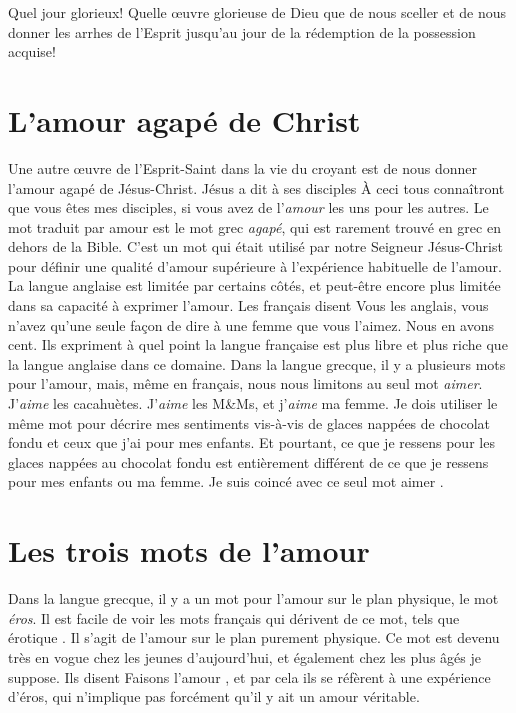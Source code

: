 Quel jour glorieux! Quelle œuvre glorieuse de Dieu que de nous sceller
 et de nous donner les arrhes de l'Esprit jusqu'au jour de la rédemption
 de la possession acquise!


\section{L'amour agap\'e de Christ}

Une autre œuvre de l'Esprit-Saint dans la vie du croyant
 est de nous donner l'amour agapé de Jésus-Christ.
 Jésus a dit à ses disciples\frcolon{}
 \Og À ceci tous connaîtront que vous êtes mes disciples,
 si vous avez de l'\emph{amour} les uns pour les autres. \Fg{}
 Le mot traduit par \Og amour \Fg{} est le mot grec \emph{agapé},
 qui est rarement trouvé en grec en dehors de la Bible.
 C'est un mot qui était utilisé par notre Seigneur Jésus-Christ
 pour définir une qualité d'amour supérieure à l'expérience habituelle
 de l'amour.
 La langue anglaise est limitée par certains côtés,
 et peut-être encore plus limitée dans sa capacité à exprimer l'amour.
 Les français disent\frcolon{}
 \Og Vous les anglais, vous n'avez qu'une seule façon de dire à une femme
 que vous l'aimez. Nous en avons cent. \Fg{}
 Ils expriment à quel point la langue française est plus libre et plus riche
 que la langue anglaise dans ce domaine.
 Dans la langue grecque, il y a plusieurs mots pour l'amour,
 mais, même en français, nous nous limitons au seul mot \emph{aimer}.
 J'\emph{aime} les cacahuètes. J'\emph{aime} les M\&Ms,
 et j'\emph{aime} ma femme.
 Je dois utiliser le même mot pour décrire mes sentiments
 vis-à-vis de glaces nappées de chocolat fondu et ceux que j'ai
 pour mes enfants. Et pourtant, ce que je ressens pour les glaces nappées
 au chocolat fondu est entièrement différent de ce que je ressens
 pour mes enfants ou ma femme.
 Je suis coincé avec ce seul mot \Og aimer \Fg{}.


\section{Les trois mots de l'amour}

Dans la langue grecque, il y a un mot pour l'amour sur le plan physique,
 le mot \emph{éros}.
 Il est facile de voir les mots français qui dérivent de ce mot,
 tels que \Og érotique \Fg{}.
 Il s'agit de l'amour sur le plan purement physique.
 Ce mot est devenu très en vogue chez les jeunes d'aujourd'hui,
 et également chez les plus âgés je suppose. Ils disent\frcolon{}
 \Og Faisons l'amour \Fg{}, et par cela ils se réfèrent
 à une expérience  d'éros, qui n'implique pas forcément
 qu'il y ait un amour véritable.

